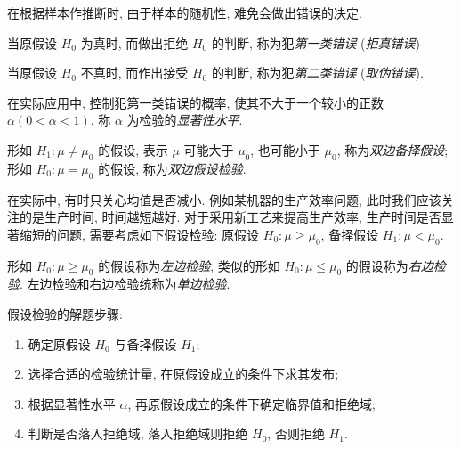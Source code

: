 在根据样本作推断时, 由于样本的随机性, 难免会做出错误的决定.

\begin{definition}[第一类错误]
    当原假设 $ H_{0} $ 为真时, 而做出拒绝 $ H_{0} $ 的判断, 称为犯\textit{第一类错误} (\textit{拒真错误})
\end{definition}

\begin{definition}[第二类错误]
    当原假设 $ H_{0} $ 不真时, 而作出接受 $ H_{0} $ 的判断, 称为犯\textit{第二类错误} (\textit{取伪错误}).
\end{definition}

\begin{definition}[显著性水平]
    在实际应用中, 控制犯第一类错误的概率, 使其不大于一个较小的正数 $ \alpha(0<\alpha<1)$, 称 $ \alpha $ 为检验的\textit{显著性水平}.
\end{definition}

\begin{definition}[双边备择假设与双边假设检验]
    形如 $ H_{1}: \mu \neq \mu_{0} $ 的假设, 表示 $ \mu $ 可能大于 $ \mu_{0} $, 也可能小于 $ \mu_{0}$, 称为\textit{双边备择假设};
    形如 $ H_{0}: \mu=\mu_{0} $ 的假设, 称为\textit{双边假设检验}.
\end{definition}

在实际中, 有时只关心均值是否减小. 例如某机器的生产效率问题, 此时我们应该关注的是生产时间, 时间越短越好.
对于采用新工艺来提高生产效率, 生产时间是否显著缩短的问题, 需要考虑如下假设检验:
原假设 $ H_{0}: \mu \geqslant \mu_{0}$, 备择假设 $ H_{1}: \mu<\mu_{0} .$

\begin{definition}[单边检验]
    形如 $ H_{0}: \mu \geqslant \mu_{0} $ 的假设称为\textit{左边检验}, 类似的形如 $ H_{0}: \mu \leqslant \mu_{0} $ 的假设称为\textit{右边检验}.
    左边检验和右边检验统称为\textit{单边检验}.
\end{definition}

假设检验的解题步骤:
\begin{enumerate}[label=(\arabic{*})]
    \item 确定原假设 $H_0$ 与备择假设 $H_1$;
    \item 选择合适的检验统计量, 在原假设成立的条件下求其发布;
    \item 根据显著性水平 $\alpha$, 再原假设成立的条件下确定临界值和拒绝域;
    \item 判断是否落入拒绝域, 落入拒绝域则拒绝 $H_0$, 否则拒绝 $H_1$.
\end{enumerate}

